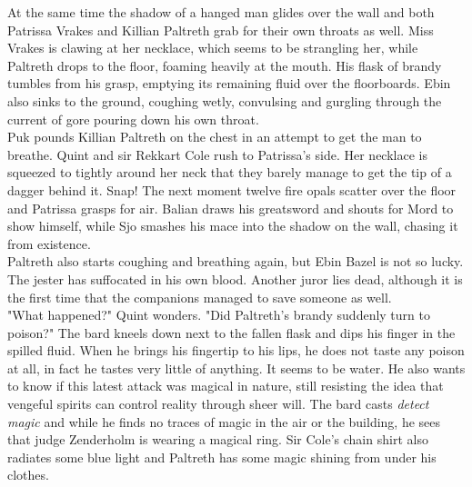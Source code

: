 At the same time the shadow of a hanged man glides over the wall and both Patrissa Vrakes and Killian Paltreth grab for their own throats as well. Miss Vrakes is clawing at her necklace, which seems to be strangling her, while Paltreth drops to the floor, foaming heavily at the mouth. His flask of brandy tumbles from his grasp, emptying its remaining fluid over the floorboards. Ebin also sinks to the ground, coughing wetly, convulsing and gurgling through the current of gore pouring down his own throat.\\

Puk pounds Killian Paltreth on the chest in an attempt to get the man to breathe. Quint and sir Rekkart Cole rush to Patrissa's side. Her necklace is squeezed to tightly around her neck that they barely manage to get the tip of a dagger behind it. Snap! The next moment twelve fire opals scatter over the floor and Patrissa grasps for air. Balian draws his greatsword and shouts for Mord to show himself, while Sjo smashes his mace into the shadow on the wall, chasing it from existence.\\

Paltreth also starts coughing and breathing again, but Ebin Bazel is not so lucky. The jester has suffocated in his own blood. Another juror lies dead, although it is the first time that the companions managed to save someone as well.\\

"What happened?" Quint wonders. "Did Paltreth's brandy suddenly turn to poison?" The bard kneels down next to the fallen flask and dips his finger in the spilled fluid. When he brings his fingertip to his lips, he does not taste any poison at all, in fact he tastes very little of anything. It seems to be water. He also wants to know if this latest attack was magical in nature, still resisting the idea that vengeful spirits can control reality through sheer will. The bard casts {\itshape detect magic} and while he finds no traces of magic in the air or the building, he sees that judge Zenderholm is wearing a magical ring. Sir Cole's chain shirt also radiates some blue light and Paltreth has some magic shining from under his clothes. 